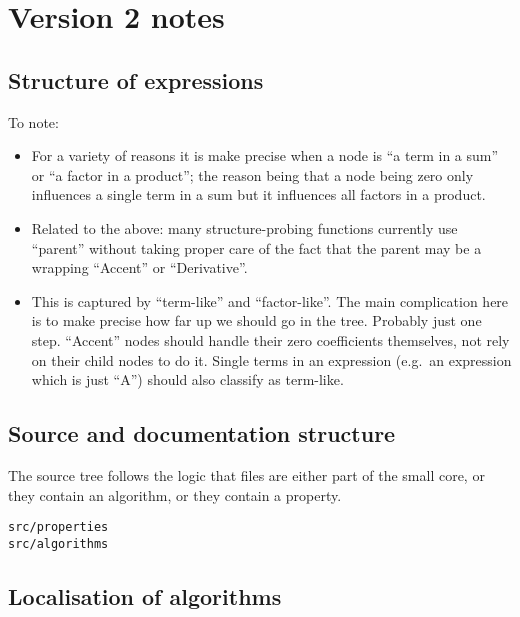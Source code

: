 \documentclass[11pt]{article}
\begin{document}

\section{Version 2 notes}

\subsection{Structure of expressions}

To note:
\begin{itemize}
\item For a variety of reasons it is make precise when a node is ``a
  term in a sum'' or ``a factor in a product''; the reason being that
  a node being zero only influences a single term in a sum but it
  influences all factors in a product. 

\item Related to the above: many structure-probing functions currently
  use ``parent'' without taking proper care of the fact that the
  parent may be a wrapping ``Accent'' or ``Derivative''. 

\item This is captured by ``term-like'' and ``factor-like''. The main
  complication here is to make precise how far up we should go in the
  tree. Probably just one step. ``Accent'' nodes should handle their
  zero coefficients themselves, not rely on their child nodes to do
  it. Single terms in an expression (e.g.~an expression which is just
  ``A'') should also classify as term-like.
\end{itemize}

\subsection{Source and documentation structure}

The source tree follows the logic that files are either part of the
small core, or they contain an algorithm, or they contain a property. 
\begin{verbatim}
src/properties
src/algorithms
\end{verbatim}

\subsection{Localisation of algorithms}
\end{document}
